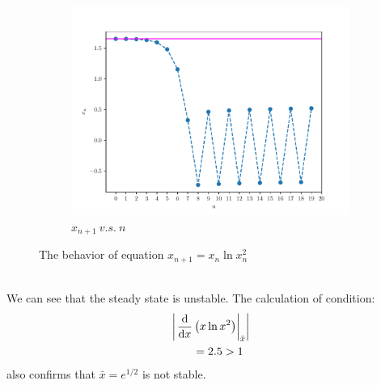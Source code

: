 \begin{homeworkProblem}[2]
\begin{enumerate}
\begin{figure}[h]
\begin{subfigure}[t]{0.4\linewidth}
        \includegraphics[scale=0.5]{../fig/fig2(d).pdf}
        \caption{$x_{n+1}\ v.s.\ n$}
    \end{subfigure}
    \centering
    \caption{The behavior of equation $x_{n+1} = x_n \ln x_n^2$}
\end{figure}
\\
We can see that the steady state is unstable. The calculation of condition:
\[
    \begin{aligned}
        &\left|\left.\frac{\mathrm{d}}{\mathrm{d}x} \left(x\ln x^2\right)\right|_{\bar x}\right|\\
        &\qquad = 2.5 > 1
    \end{aligned}
\]
also confirms that $\bar x = e^{1/2}$ is not stable.
\end{enumerate}
\end{homeworkProblem}